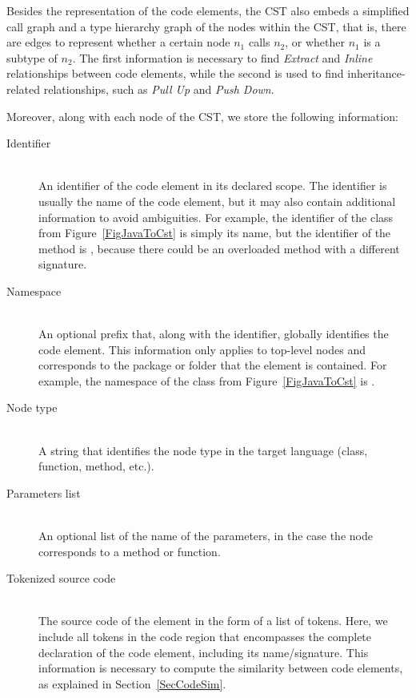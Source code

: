 Besides the representation of the code elements, the CST also embeds a simplified call graph and  a type hierarchy graph of the nodes within the CST, that is, there are edges to represent whether a certain node $n_1$ calls $n_2$, or whether $n_1$ is a subtype of $n_2$. The first information is necessary to find \emph{Extract} and \emph{Inline} relationships between code elements, while the second is used to find inheritance-related relationships, such as \emph{Pull Up} and \emph{Push Down}.

Moreover, along with each node of the CST, we store the following information:
\begin{description}
    \item[Identifier] \hfill \\
    An identifier of the code element in its declared scope. 
    The identifier is usually the name of the code element, but it may also contain additional information to avoid ambiguities.
    For example, the identifier of the class  from Figure~\ref{FigJavaToCst} is simply its name, but the identifier of the method  is ,  because there could be an overloaded method with a different signature.
    
    \item[Namespace] \hfill \\
    An optional prefix that, along with the identifier, globally identifies the code element. 
    This information only applies to top-level nodes and corresponds to the package or folder that the element is contained. For example, the namespace of the class  from Figure~\ref{FigJavaToCst} is .
    
    \item[Node type] \hfill \\
    A string that identifies the node type in the target language (class, function, method, etc.).
    
    \item[Parameters list]  \hfill \\
    An optional list of the name of the parameters, in the case the node corresponds to a method or function.
    
    \item[Tokenized source code]  \hfill \\
    The source code of the element in the form of a list of tokens.
    Here, we include all tokens in the code region that encompasses the complete declaration of the code element, including its name/signature.
    This information is necessary to compute the similarity between code elements, as explained in Section~\ref{SecCodeSim}.
    

\end{description}
